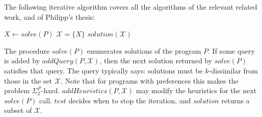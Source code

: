 \documentclass[a4paper,10pt]{article}
\begin{document}
The following iterative algorithm covers all the algorithms of the relevant related work, 
and of Philipp's thesis:

\begin{algorithm}[ht]\caption{$\mathit{iterative}(P,n,k)$\label{algo:solve:oldopt}}
  
  \BlankLine
  $X \leftarrow \mathit{solve}(P)$\;
  \;
  $\mathcal{X} = \{ X \}$\;
  \Return $\mathit{solution}(\mathcal{X})$\;
\end{algorithm}%

The procedure $solve(P)$ enumerates solutions of the program $P$.
If some query is added by $addQuery(P,\mathcal{X})$, then the next solution returned by $solve(P)$ satisfies that query.
The query typically says: solutions must be $k$-dissimilar from those in the set $\mathcal{X}$.
Note that for programs with preferences this makes the problem $\Sigma^P_2$-hard.
$addHeuristics(P,\mathcal{X})$ may modify the heuristics for the next $solve(P)$ call.
$test$ decides when to stop the iteration, and $solution$ returns a subset of $\mathcal{X}$.
\end{document}
